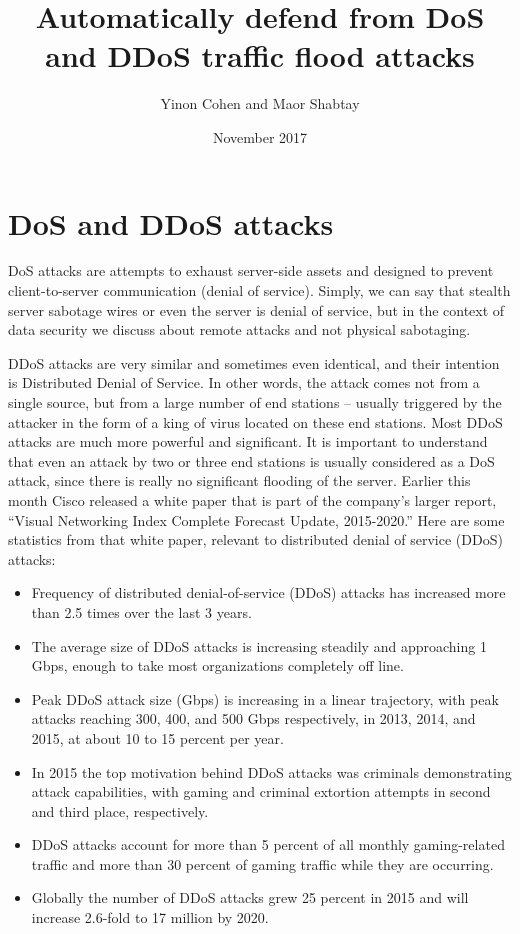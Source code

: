 \documentclass{article}
\title{Automatically defend from DoS and DDoS traffic flood attacks}
\author{Yinon Cohen and Maor Shabtay }
\date{November 2017}
\begin{document}
\maketitle

\section*{DoS and DDoS attacks}
\hfill \break DoS attacks are attempts to exhaust server-side assets and designed to prevent client-to-server communication (denial of service). Simply, we can say that stealth server sabotage wires or even the server is denial of service, but in the context of data security we discuss about remote attacks and not physical sabotaging.

\hfill \break DDoS attacks are very similar and sometimes even identical, and their intention is Distributed Denial of Service. In other words, the attack comes not from a single source, but from a large number of end stations – usually triggered by the attacker in the form of a king of virus located on these end stations. Most DDoS attacks are much more powerful and significant. It is important to understand that even an attack by two or three end stations is usually considered as a DoS attack, since there is really no significant flooding of the server.
\hfill \break Earlier this month Cisco released a white paper that is part of the company’s larger report, “Visual Networking Index Complete Forecast Update, 2015-2020.” Here are some statistics from that white paper, relevant to distributed denial of service (DDoS) attacks:
\begin{itemize}
\item Frequency of distributed denial-of-service (DDoS) attacks has increased more than 2.5 times over the last 3 years.
\item	The average size of DDoS attacks is increasing steadily and approaching 1 Gbps, enough to take most organizations completely off line.
\item	Peak DDoS attack size (Gbps) is increasing in a linear trajectory, with peak attacks reaching 300, 400, and 500 Gbps respectively, in 2013, 2014, and 2015, at about 10 to 15 percent per year.
\item	In 2015 the top motivation behind DDoS attacks was criminals demonstrating attack capabilities, with gaming and criminal extortion attempts in second and third place, respectively.
\item	DDoS attacks account for more than 5 percent of all monthly gaming-related traffic and more than 30 percent of gaming traffic while they are occurring.
\item	Globally the number of DDoS attacks grew 25 percent in 2015 and will increase 2.6-fold to 17 million by 2020.
\end{itemize}
\end{document}
